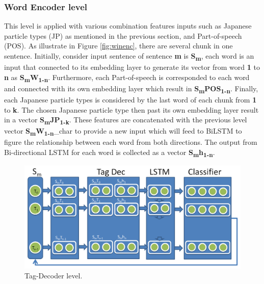 \begin{CJK*}{UTF8}{min}
\subsubsection{Word Encoder level}
This level is applied with various combination features inputs such as Japanese particle types (JP) as mentioned in the previous section, and Part-of-speech (POS).
As illustrate in Figure \ref{fig:winenc}, there are several chunk in one sentence.
Initially, consider input sentence of sentence \textbf{m} is \textbf{S\textsubscript{m}}, each word is an input that connected to its embedding layer to generate its vector from word \textbf{1} to \textbf{n} as \textbf{S\textsubscript{m}W\textsubscript{1-n}}.
Furthermore, each Part-of-speech is corresponded to each word and connected with its own embedding layer which result in \textbf{S\textsubscript{m}POS\textsubscript{1-n}}.
Finally, each Japanese particle types is considered by the last word of each chunk from \textbf{1} to \textbf{k}.
The chosen Japanese particle type then past its own embedding layer result in a vector \textbf{S\textsubscript{m}JP\textsubscript{1-k}}.
These features are concatenated with the previous level vector \textbf{S\textsubscript{m}W\textsubscript{1-n}}\_char to provide a new input which will feed to BiLSTM to figure the relationship between each word from both directions.
The output from Bi-directional LSTM for each word is collected as a vector \textbf{S\textsubscript{m}h\textsubscript{1-n}}.



\begin{figure}[!h]
\centering
  \includegraphics[scale=0.3]{tag_decoder.png}
  \caption{Tag-Decoder level.} 

  \label{fig:tagdec}
\end{figure}


\end{CJK*}
